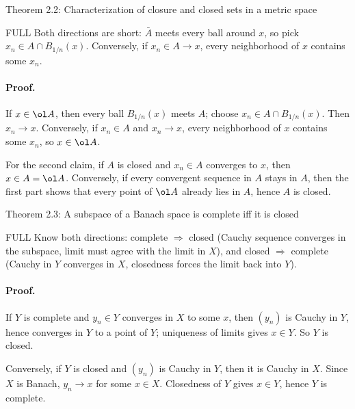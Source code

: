 \documentclass[header={Lecture 1 Exam Study Notes}]{study-note}
\begin{document}
\begin{thmbox}{Theorem 2.2: Characterization of closure and closed sets in a metric space}
\thmClosureSequential
\end{thmbox}

\begin{prooflevelbox}{FULL}
Both directions are short: $\bar A$ meets every ball around $x$, so pick $x_n\in A\cap B_{1/n}(x)$. Conversely, if $x_n\in A\to x$, every neighborhood of $x$ contains some $x_n$.
\end{prooflevelbox}

\paragraph{Proof.}
If $x\in\ol A$, then every ball $B_{1/n}(x)$ meets $A$; choose $x_n\in A\cap B_{1/n}(x)$. Then $x_n\to x$. Conversely, if $x_n\in A$ and $x_n\to x$, every neighborhood of $x$ contains some $x_n$, so $x\in\ol A$.

For the second claim, if $A$ is closed and $x_n\in A$ converges to $x$, then $x\in A=\ol A$. Conversely, if every convergent sequence in $A$ stays in $A$, then the first part shows that every point of $\ol A$ already lies in $A$, hence $A$ is closed.

\begin{thmbox}{Theorem 2.3: A subspace of a Banach space is complete iff it is closed}
\thmSubspaceCompleteIffClosed
\end{thmbox}

\begin{prooflevelbox}{FULL}
Know both directions: complete $\Rightarrow$ closed (Cauchy sequence converges in the subspace, limit must agree with the limit in $X$), and closed $\Rightarrow$ complete (Cauchy in $Y$ converges in $X$, closedness forces the limit back into $Y$).
\end{prooflevelbox}

\paragraph{Proof.}
If $Y$ is complete and $y_n\in Y$ converges in $X$ to some $x$, then $(y_n)$ is Cauchy in $Y$, hence converges in $Y$ to a point of $Y$; uniqueness of limits gives $x\in Y$. So $Y$ is closed.

Conversely, if $Y$ is closed and $(y_n)$ is Cauchy in $Y$, then it is Cauchy in $X$. Since $X$ is Banach, $y_n\to x$ for some $x\in X$. Closedness of $Y$ gives $x\in Y$, hence $Y$ is complete.
\end{document}
